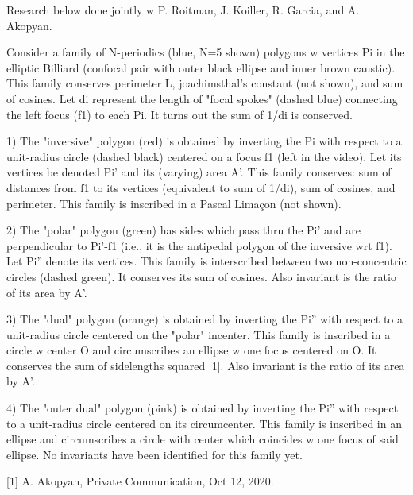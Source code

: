 Research below done jointly w P. Roitman, J. Koiller, R. Garcia, and A. Akopyan.

Consider a family of N-periodics (blue, N=5 shown) polygons w vertices Pi in the elliptic Billiard (confocal pair with outer black ellipse and inner brown caustic). This family conserves perimeter L, joachimsthal's constant (not shown), and sum of cosines. Let di represent the length of "focal spokes" (dashed blue) connecting the left focus (f1) to each Pi. It turns out the sum of 1/di is conserved.

1) The "inversive" polygon (red) is obtained by inverting the Pi with respect to a unit-radius circle (dashed black) centered on a focus f1 (left in the video). Let its vertices be denoted Pi' and its (varying) area A'. This family conserves: sum of distances from f1 to its vertices (equivalent to sum of 1/di), sum of cosines, and perimeter. This family is inscribed in a Pascal Limaçon (not shown). 

2) The "polar" polygon (green) has sides which pass thru the Pi' and are perpendicular to Pi'-f1 (i.e., it is the antipedal polygon of the inversive wrt f1). Let Pi'' denote its vertices. This family is interscribed between two non-concentric circles (dashed green). It conserves its sum of cosines. Also invariant is the ratio of its area by A'.

3) The "dual" polygon (orange) is obtained by inverting the Pi'' with respect to a unit-radius circle centered on the "polar" incenter. This family is inscribed in a circle w center O and circumscribes an ellipse w one focus centered on O. It conserves the sum of sidelengths squared [1]. Also invariant is the ratio of its area by A'.

4) The "outer dual" polygon (pink) is obtained by inverting the Pi'' with respect to a unit-radius circle centered on its circumcenter. This family is inscribed in an ellipse and circumscribes a circle with center which coincides w one focus of said ellipse. No invariants have been identified for this family yet.

[1] A. Akopyan, Private Communication, Oct 12, 2020.
